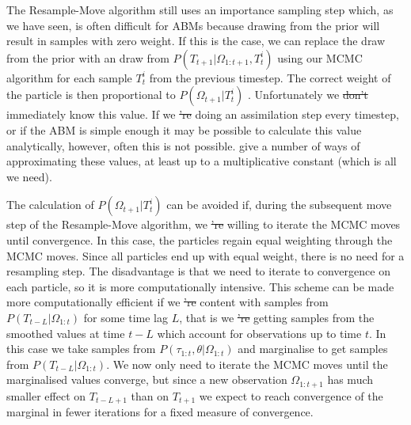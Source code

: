 \documentclass{article}
\providecommand{\DIFaddtex}[1]{{\protect\color{blue}\uwave{#1}}} %
\providecommand{\DIFdeltex}[1]{{\protect\color{red}\sout{#1}}}                      %
\providecommand{\DIFaddbegin}{} %
\providecommand{\DIFaddend}{} %
\providecommand{\DIFdelbegin}{} %
\providecommand{\DIFdelend}{} %
\providecommand{\DIFadd}[1]{\texorpdfstring{\DIFaddtex{#1}}{#1}} %
\providecommand{\DIFdel}[1]{\texorpdfstring{\DIFdeltex{#1}}{}} %
\newcommand{\DIFscaledelfig}{0.5}
\newlength{\DIFdelgraphicswidth} %
\newlength{\DIFdelgraphicsheight} %
\newcommand{\DIFaddincludegraphics}[2][]{{\color{blue}\fbox{\DIFOincludegraphics[#1]{#2}}}} %
\newcommand{\DIFdelincludegraphics}[2][]{%
\sbox{\DIFdelgraphicsbox}{\DIFOincludegraphics[#1]{#2}}%
\settoboxwidth{\DIFdelgraphicswidth}{\DIFdelgraphicsbox} %
\settoboxtotalheight{\DIFdelgraphicsheight}{\DIFdelgraphicsbox} %
\scalebox{\DIFscaledelfig}{%
\parbox[b]{\DIFdelgraphicswidth}{\usebox{\DIFdelgraphicsbox}\\[-\baselineskip] \rule{\DIFdelgraphicswidth}{0em}}\llap{\resizebox{\DIFdelgraphicswidth}{\DIFdelgraphicsheight}{%
\setlength{\unitlength}{\DIFdelgraphicswidth}%
\begin{picture}(1,1)%
\thicklines\linethickness{2pt} %
{\color[rgb]{1,0,0}\put(0,0){\framebox(1,1){}}}%
{\color[rgb]{1,0,0}\put(0,0){\line( 1,1){1}}}%
{\color[rgb]{1,0,0}\put(0,1){\line(1,-1){1}}}%
\end{picture}%
}\hspace*{3pt}}} %
} %
\DeclareRobustCommand{\DIFaddbegin}{\DIFOaddbegin \let\includegraphics\DIFaddincludegraphics} %
\DeclareRobustCommand{\DIFaddend}{\DIFOaddend \let\includegraphics\DIFOincludegraphics} %
\DeclareRobustCommand{\DIFdelbegin}{\DIFOdelbegin \let\includegraphics\DIFdelincludegraphics} %
\DeclareRobustCommand{\DIFdelend}{\DIFOaddend \let\includegraphics\DIFOincludegraphics} %
\begin{document}
The Resample-Move algorithm still uses an importance sampling step which, as we have seen, is often difficult for ABMs because drawing from the prior will result in samples with zero weight. If this is the case, we can replace the draw from the prior with an draw from $P(T_{t+1}|\Omega_{1:{t+1}},T^i_t)$ using our MCMC algorithm for each sample $T^i_t$ from the previous timestep. The correct weight of the particle is then proportional to $P(\Omega_{t+1}|T^i_t)$ \citep{doucet2009tutorial}. Unfortunately we \DIFdelbegin \DIFdel{don't }\DIFdelend \DIFaddbegin \DIFadd{do not }\DIFaddend immediately know this value. If we \DIFdelbegin \DIFdel{'re }\DIFdelend \DIFaddbegin \DIFadd{are }\DIFaddend doing an assimilation step every timestep, or if the ABM is simple enough it may be possible to calculate this value analytically, however, often this is not possible.   \citet*{han2001markov, newton1994approximate, stefankovic2009adaptive} give a number of ways of approximating these values, at least up to a multiplicative constant (which is all we need).

The calculation of $P(\Omega_{t+1}|T^i_t)$ can be avoided if, during the subsequent move step of the Resample-Move algorithm, we \DIFdelbegin \DIFdel{'re }\DIFdelend \DIFaddbegin \DIFadd{are }\DIFaddend willing to iterate the MCMC moves until convergence. In this case, the particles regain equal weighting through the MCMC moves. Since all particles end up with equal weight, there is no need for a resampling step. The disadvantage is that we need to iterate to convergence on each particle, so it is more computationally intensive. This scheme can be made more computationally efficient if we \DIFdelbegin \DIFdel{'re }\DIFdelend \DIFaddbegin \DIFadd{were }\DIFaddend content with samples from $P(T_{t-L}|\Omega_{1:t})$ for some time lag $L$, that is we \DIFdelbegin \DIFdel{'re }\DIFdelend \DIFaddbegin \DIFadd{were }\DIFaddend getting samples from the smoothed values at time $t-L$ which account for observations up to time $t$. In this case we take samples from $P(\tau_{1:t},\theta|\Omega_{1:t})$ and marginalise to get samples from $P(T_{t-L}|\Omega_{1:t})$. We now only need to iterate the MCMC moves until the marginalised values converge, but since a new observation $\Omega_{1:t+1}$ has much smaller effect on $T_{t-L+1}$ than on $T_{t+1}$ we expect to reach convergence of the marginal in fewer iterations for a fixed measure of convergence.
\end{document}
